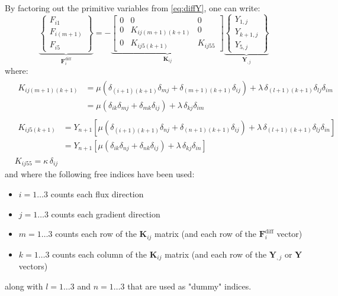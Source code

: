 \documentclass{ucb}
\begin{document}
\begin{enumerate}
By factoring out the primitive variables from \autoref{eq:diffY}, one can write:
\begin{equation}
    \underbrace{
        \begin{Bmatrix}
            F_{i1} \\
            F_{i(m+1)} \\
            F_{i5}
        \end{Bmatrix}
    }_{\bm{F}_i^\mathrm{diff}}
    =
    -
    \underbrace{
        \begin{bmatrix}
            0 & 0 & 0 \\
            0 & K_{ij(m+1)(k+1)} & 0 \\
            0 & K_{ij5(k+1)} & K_{ij55}
        \end{bmatrix}
    }_{\bm{K}_{ij}}
    \underbrace{
        \begin{Bmatrix}
            Y_{1,j} \\
            Y_{k+1,j} \\
            Y_{5,j}
        \end{Bmatrix}
    }_{\bm{Y}_{,j}}
    \label{eq:Kij}
\end{equation}
where:
\begin{align}
    &\begin{aligned}
        K_{ij(m+1)(k+1)} &= \mu\left(\delta_{(i+1)(k+1)}\delta_{mj} + \delta_{(m+1)(k+1)}\delta_{ij}\right) + \lambda\,\delta_{(l+1)(k+1)}\delta_{lj}\delta_{im} \\
        &= \mu\left(\delta_{ik}\delta_{mj} + \delta_{mk}\delta_{ij}\right) + \lambda\,\delta_{kj}\delta_{im}
    \end{aligned}
    \\
    &\begin{aligned}
        K_{ij5(k+1)} &= Y_{n+1}\left[\mu\left(\delta_{(i+1)(k+1)}\delta_{nj} + \delta_{(n+1)(k+1)}\delta_{ij}\right) + \lambda\,\delta_{(l+1)(k+1)}\delta_{lj}\delta_{in}\right] \\
        &= Y_{n+1}\left[\mu\left(\delta_{ik}\delta_{nj} + \delta_{nk}\delta_{ij}\right) + \lambda\,\delta_{kj}\delta_{in}\right]
    \end{aligned}
    \\
    &K_{ij55} = \kappa \, \delta_{ij}
\end{align}
and where the following free indices have been used:
\begin{itemize}
    \item $i = 1 \ldots 3$ counts each flux direction
    \item $j = 1 \ldots 3$ counts each gradient direction
    \item $m = 1 \ldots 3$ counts each row of the $\bm{K}_{ij}$ matrix (and each row of the $\bm{F}_i^\mathrm{diff}$ vector)
    \item $k = 1 \ldots 3$ counts each column of the $\bm{K}_{ij}$ matrix (and each row of the $\bm{Y}_{,j}$ or $\bm{Y}$ vectors)
\end{itemize}
along with $l = 1 \ldots 3$ and $n = 1 \ldots 3$ that are used as "dummy" indices.


\end{enumerate}
\end{document}
